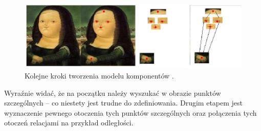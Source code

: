 \begin{figure}[ht]
	\centering
	\includegraphics[width=\textwidth]{images/CB_mona_lisa.png}
	\caption{Kolejne kroki tworzenia modelu komponentów \cite{Lopez2008}.}
	\label{fig:component_based_mona_lisa}
\end{figure}

Wyraźnie widać, że na początku należy wyszukać w obrazie punktów szczególnych -- co niestety jest trudne do zdefiniowania. Drugim etapem jest wyznaczenie pewnego otoczenia tych punktów szczególnych oraz połączenia tych otoczeń relacjami na przykład odległości.

